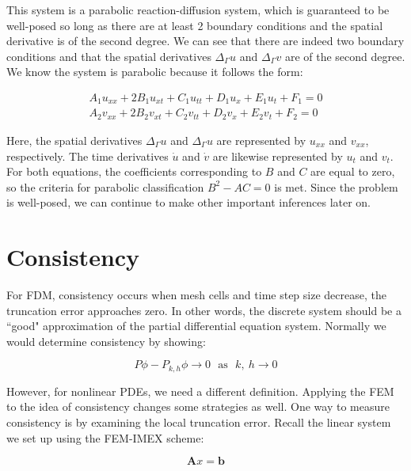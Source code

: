 \documentclass[12pt]{article}
\begin{document}
This system is a parabolic reaction-diffusion system, which is guaranteed to be well-posed so long as there are at least 2 boundary conditions and the spatial derivative is of the second degree. We can see that there are indeed two boundary conditions and that the spatial derivatives $\Delta_\Gamma u$ and $\Delta_\Gamma v$ are of the second degree. We know the system is parabolic because it follows the form:

\begin{equation}
	\begin{aligned}
		A_1u_{xx} + 2B_1u_{xt} + C_1u_{tt} + D_1u_x + E_1u_t + F_1 = 0 \\
		A_2v_{xx} + 2B_2v_{xt} + C_2v_{tt} + D_2v_x + E_2v_t + F_2 = 0
	\end{aligned}
\end{equation}

Here, the spatial derivatives $\Delta_\Gamma u$ and $\Delta_\Gamma u$ are represented by $u_{xx}$ and $v_{xx}$, respectively. The time derivatives $\dot{u}$ and $\dot{v}$ are likewise represented by $u_t$ and $v_t$. For both equations, the coefficients corresponding to $B$ and $C$ are equal to zero, so the criteria for parabolic classification $B^2-AC=0$ is met. Since the problem is well-posed, we can continue to make other important inferences later on.


\section{Consistency}

For FDM, consistency occurs when mesh cells and time step size decrease, the truncation error approaches zero. In other words, the discrete system should be a ``good" approximation of the partial differential equation system. Normally we would determine consistency by showing:

\begin{equation}
	P\phi - P_{k,h}\phi \rightarrow 0 ~~~\text{as} ~~~ k,~h \rightarrow 0
\end{equation}

However, for nonlinear PDEs, we need a different definition. Applying the FEM to the idea  of consistency changes some strategies as well. One way to measure consistency is by examining the local truncation error. Recall the linear system we set up using the FEM-IMEX scheme:

\begin{equation}
	\textbf{A}x=\textbf{b}
\end{equation}
\end{document}
